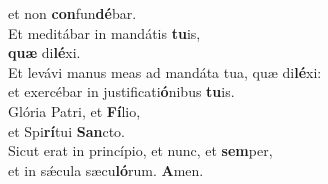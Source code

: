 \evenverse et non \textbf{con}fun\textbf{dé}bar.\\
\oddverse Et meditábar in mandátis \textbf{tu}is,~\*\\
\oddverse \textbf{quæ} di\textbf{lé}xi.\\
\evenverse Et levávi manus meas ad mandáta tua, quæ di\textbf{lé}xi:~\*\\
\evenverse et exercébar in justificati\textbf{ó}nibus \textbf{tu}is.\\
\oddverse Glória Patri, et \textbf{Fí}lio,~\*\\
\oddverse et Spi\textbf{rí}tui \textbf{San}cto.\\
\evenverse Sicut erat in princípio, et nunc, et \textbf{sem}per,~\*\\
\evenverse et in sǽcula sæcu\textbf{ló}rum. \textbf{A}men.\\
